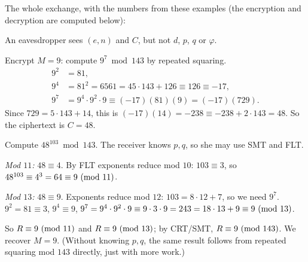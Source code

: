The whole exchange, with the numbers from these examples (the encryption and decryption are
computed below):
\begin{center}
\end{center}
An eavesdropper sees $(e,n)$ and $C$, but not $d$, $p$, $q$ or $\varphi$.

\begin{example}[Encryption]
Encrypt $M = 9$: compute $9^7 \bmod 143$ by repeated squaring.
\begin{align*}
9^2 &= 81,\\
9^4 &= 81^2 = 6561 = 45\cdot 143 + 126 \equiv 126 \equiv -17,\\
9^7 &= 9^4\cdot 9^2\cdot 9 \equiv (-17)(81)(9) = (-17)(729).
\end{align*}
Since $729 = 5\cdot 143 + 14$, this is $(-17)(14) = -238 \equiv -238 + 2\cdot 143 = 48$.
So the ciphertext is $C = 48$.
\end{example}

\begin{example}[Decryption]
Compute $48^{103} \bmod 143$. The receiver knows $p,q$, so she may use SMT and FLT.

\emph{Mod $11$:} $48 \equiv 4$. By FLT exponents reduce mod $10$: $103 \equiv 3$, so
$48^{103} \equiv 4^3 = 64 \equiv 9 \ (\mathrm{mod}\ 11)$.

\emph{Mod $13$:} $48 \equiv 9$. Exponents reduce mod $12$: $103 = 8\cdot 12 + 7$, so we need
$9^7$. $9^2 = 81 \equiv 3$, $9^4 \equiv 9$, $9^7 = 9^4\cdot 9^2\cdot 9 \equiv 9 \cdot 3\cdot 9 = 243 =
18\cdot 13 + 9\equiv 9 \ (\mathrm{mod}\ 13)$.

So $R \equiv 9 \ (\mathrm{mod}\ 11)$ and $R \equiv 9 \ (\mathrm{mod}\ 13)$; by CRT/SMT, $R \equiv 9 \ (\mathrm{mod}\ 143)$. We recover
$M = 9$. (Without knowing $p,q$, the same result follows from repeated squaring mod $143$
directly, just with more work.)
\end{example}

